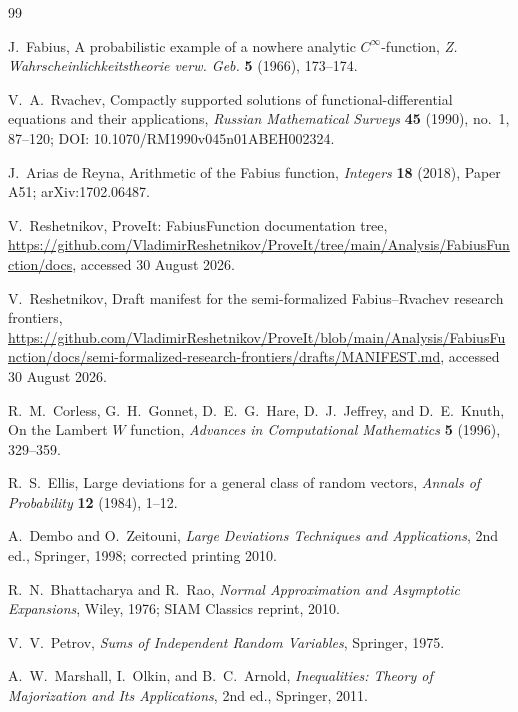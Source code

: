 \documentclass[11pt,a4paper]{article}
\theoremstyle{definition}
\newcommand{\1}{\mathbf{1}}
\begin{document}
\begin{thebibliography}{99}

J.~Fabius,
\newblock A probabilistic example of a nowhere analytic $C^\infty$-function,
\newblock \emph{Z. Wahrscheinlichkeitstheorie verw. Geb.} \textbf{5}
(1966), 173--174.

V.~A.~Rvachev,
\newblock Compactly supported solutions of functional-differential equations
and their applications,
\newblock \emph{Russian Mathematical Surveys} \textbf{45} (1990), no.~1,
87--120; DOI: 10.1070/RM1990v045n01ABEH002324.

J.~Arias de Reyna,
\newblock Arithmetic of the Fabius function,
\newblock \emph{Integers} \textbf{18} (2018), Paper A51; arXiv:1702.06487.

V.~Reshetnikov,
\newblock ProveIt: FabiusFunction documentation tree,
\newblock \url{https://github.com/VladimirReshetnikov/ProveIt/tree/main/Analysis/FabiusFunction/docs},
accessed 30 August 2026.

V.~Reshetnikov,
\newblock Draft manifest for the semi-formalized Fabius--Rvachev research
frontiers,
\newblock \url{https://github.com/VladimirReshetnikov/ProveIt/blob/main/Analysis/FabiusFunction/docs/semi-formalized-research-frontiers/drafts/MANIFEST.md},
accessed 30 August 2026.

R.~M.~Corless, G.~H.~Gonnet, D.~E.~G.~Hare, D.~J.~Jeffrey, and D.~E.~Knuth,
\newblock On the Lambert $W$ function,
\newblock \emph{Advances in Computational Mathematics} \textbf{5} (1996),
329--359.

R.~S.~Ellis,
\newblock Large deviations for a general class of random vectors,
\newblock \emph{Annals of Probability} \textbf{12} (1984), 1--12.

A.~Dembo and O.~Zeitouni,
\newblock \emph{Large Deviations Techniques and Applications},
\newblock 2nd ed., Springer, 1998; corrected printing 2010.

R.~N.~Bhattacharya and R.~Rao,
\newblock \emph{Normal Approximation and Asymptotic Expansions},
\newblock Wiley, 1976; SIAM Classics reprint, 2010.

V.~V.~Petrov,
\newblock \emph{Sums of Independent Random Variables},
\newblock Springer, 1975.

A.~W.~Marshall, I.~Olkin, and B.~C.~Arnold,
\newblock \emph{Inequalities: Theory of Majorization and Its Applications},
\newblock 2nd ed., Springer, 2011.


\end{thebibliography}
\end{document}

